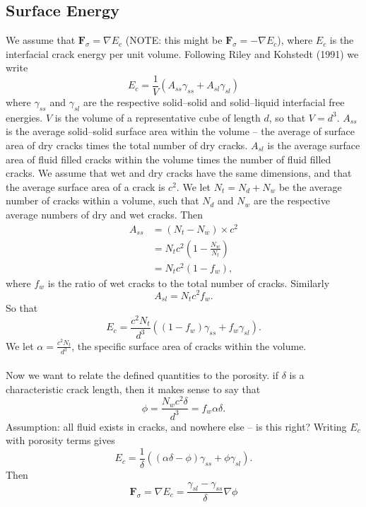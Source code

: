 \documentclass[9pt,fleqn,twoside]{article}
\theoremstyle{plain}
\theoremstyle{definition}
\theoremstyle{remark}
\begin{document}
\subsection{Surface Energy}
We assume that $\mathbf{F}_{\sigma} =
\nabla E_c$ (NOTE: this might be $\mathbf{F}_{\sigma} = -
\nabla E_c$), where $E_c$ is the interfacial crack energy per unit
volume. Following Riley and Kohstedt (1991) we write
\begin{equation}
E_c = \frac{1}{V} (A_{ss} \gamma_{ss} + A_{sl} \gamma_{sl})
\end{equation}
where $\gamma_{ss}$ and $\gamma_{sl}$ are the respective solid--solid
and solid--liquid interfacial free energies. $V$ is the volume of a
representative cube of length $d$, so that $V=d^3$. $A_{ss}$ is the
average solid--solid surface area within the volume -- the average of
surface area of dry cracks times the total number of dry cracks. $A_{sl}$ is the average surface area of
fluid filled cracks within the volume times the number of fluid filled
cracks. We assume that wet and dry
cracks have the same dimensions, and that the average surface area of
a crack  is $c^2$. We let $N_t = N_d + N_w$ be the average number of cracks within
a volume, such that $N_d$ and $N_w$ are the respective average numbers
of dry and wet cracks. Then
\begin{align}
A_{ss} &= (N_t - N_w) \times c^2 \\
&= N_t c^2 \left( 1 - \frac{N_w}{N_t} \right) \\
&= N_t c^2 ( 1 - f_w),
\end{align}
where $f_w$ is the ratio of wet cracks to the total number of
cracks. Similarly
\begin{equation}
A_{sl} = N_t c^2 f_w . 
\end{equation}
So that
\begin{equation}
E_c = \frac{c^2 N_t}{d^3} \left ( (1 - f_w) \gamma_{ss} + f_w
  \gamma_{sl} \right) .
\end{equation}
We let $\alpha = \frac{c^2 N_t}{d^3}$, the specific surface area of
cracks within the volume.\\
\\
Now we want to relate the defined quantities to the porosity. if
$\delta$ is a characteristic crack length, then it makes sense to say
that
\begin{equation}
\phi = \frac{N_w c^2 \delta}{d^3} = f_w \alpha \delta .
\end{equation}
Assumption: all fluid exists in cracks, and nowhere else -- is this
right? Writing $E_c$ with porosity terms gives
\begin{equation}
E_c = \frac{1}{\delta} \left( (\alpha \delta - \phi) \gamma_{ss} +
  \phi \gamma_{sl} \right).
\end{equation}
Then 
\begin{equation}
\mathbf{F}_{\sigma} = \nabla E_c =  \frac{\gamma_{sl} -
  \gamma_{ss}}{\delta} \nabla \phi
\end{equation}
\end{document}
